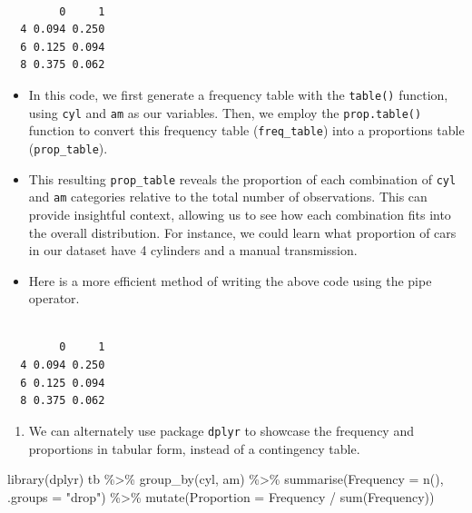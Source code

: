 \documentclass[
  letterpaper,
  DIV=11,
  numbers=noendperiod]{scrreport}
\newenvironment{Shaded}{\begin{snugshade}}{\end{snugshade}}
\newcommand{\AttributeTok}[1]{\textcolor[rgb]{0.40,0.45,0.13}{#1}}
\newcommand{\DecValTok}[1]{\textcolor[rgb]{0.68,0.00,0.00}{#1}}
\newcommand{\FunctionTok}[1]{\textcolor[rgb]{0.28,0.35,0.67}{#1}}
\newcommand{\NormalTok}[1]{\textcolor[rgb]{0.00,0.23,0.31}{#1}}
\newcommand{\SpecialCharTok}[1]{\textcolor[rgb]{0.37,0.37,0.37}{#1}}
\newcommand{\StringTok}[1]{\textcolor[rgb]{0.13,0.47,0.30}{#1}}
\providecommand{\tightlist}{%
  \setlength{\itemsep}{0pt}\setlength{\parskip}{0pt}}\usepackage{longtable,booktabs,array}
\begin{document}
\begin{verbatim}
   
        0     1
  4 0.094 0.250
  6 0.125 0.094
  8 0.375 0.062
\end{verbatim}

\begin{itemize}
\item
  In this code, we first generate a frequency table with the
  \texttt{table()} function, using \texttt{cyl} and \texttt{am} as our
  variables. Then, we employ the \texttt{prop.table()} function to
  convert this frequency table (\texttt{freq\_table}) into a proportions
  table (\texttt{prop\_table}).
\item
  This resulting \texttt{prop\_table} reveals the proportion of each
  combination of \texttt{cyl} and \texttt{am} categories relative to the
  total number of observations. This can provide insightful context,
  allowing us to see how each combination fits into the overall
  distribution. For instance, we could learn what proportion of cars in
  our dataset have 4 cylinders and a manual transmission.
\item
  Here is a more efficient method of writing the above code using the
  pipe operator.
\end{itemize}

\begin{Shaded}
\end{Shaded}

\begin{verbatim}
   
        0     1
  4 0.094 0.250
  6 0.125 0.094
  8 0.375 0.062
\end{verbatim}

\begin{enumerate}
\def\labelenumi{\arabic{enumi}.}
\setcounter{enumi}{6}
\tightlist
\item
  We can alternately use package \texttt{dplyr} to showcase the
  frequency and proportions in tabular form, instead of a contingency
  table.
\end{enumerate}

\begin{Shaded}
\begin{Highlighting}[]
\FunctionTok{library}\NormalTok{(dplyr)}
\NormalTok{tb }\SpecialCharTok{\%\textgreater{}\%}
  \FunctionTok{group\_by}\NormalTok{(cyl, am) }\SpecialCharTok{\%\textgreater{}\%}
  \FunctionTok{summarise}\NormalTok{(}\AttributeTok{Frequency =} \FunctionTok{n}\NormalTok{(), }\AttributeTok{.groups =} \StringTok{"drop"}\NormalTok{) }\SpecialCharTok{\%\textgreater{}\%}
  \FunctionTok{mutate}\NormalTok{(}\AttributeTok{Proportion =}\NormalTok{ Frequency }\SpecialCharTok{/} \FunctionTok{sum}\NormalTok{(Frequency)) }
\end{Highlighting}
\end{Shaded}
\end{document}
